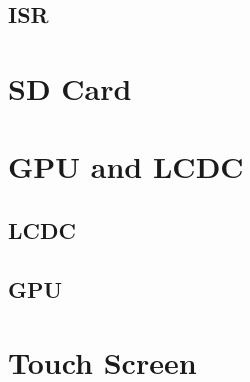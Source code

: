 \subsection{ISR}

\section{SD Card}

\section{GPU and LCDC}
\subsection{LCDC}
\subsection{GPU}

\section{Touch Screen}
